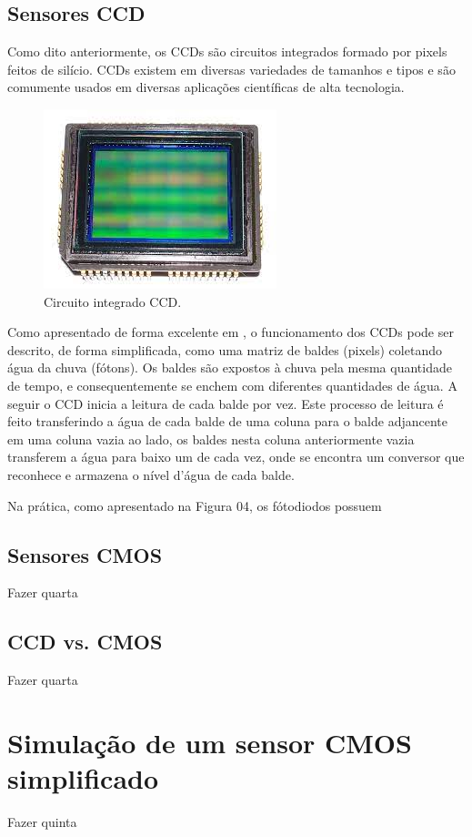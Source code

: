 \documentclass[11pt,a4paper,twocolumn]{article}
\begin{document}
	\subsection*{Sensores CCD}
	Como dito anteriormente, os CCDs são circuitos integrados formado por pixels feitos de silício. CCDs existem em diversas variedades de tamanhos e tipos e são comumente usados em diversas aplicações científicas de alta tecnologia.
	
	\begin{figure}[!h]
		\centering
		\includegraphics[scale=0.4]{imagens/ccd.jpg}
		\caption{Circuito integrado CCD.}
	\end{figure}
		
	Como apresentado de forma excelente em \cite{Spectral}, o funcionamento dos CCDs pode ser descrito, de forma simplificada, como uma matriz de baldes (pixels) coletando água da chuva (fótons). Os baldes são expostos à chuva pela mesma quantidade de tempo, e consequentemente se enchem com diferentes quantidades de água. A seguir o CCD inicia a leitura de cada balde por vez. Este processo de leitura é feito transferindo a água de cada balde de uma coluna para o balde adjancente em uma coluna vazia ao lado, os baldes nesta coluna anteriormente vazia transferem a água para baixo um de cada vez, onde se encontra um conversor que reconhece e armazena o nível d'água de cada balde.
	
	Na prática, como apresentado na Figura 04, os fótodiodos possuem 
	
	\subsection*{Sensores CMOS}
	Fazer quarta
	\subsection*{CCD vs. CMOS}
	Fazer quarta

	\section*{Simulação de um sensor CMOS simplificado}
	Fazer quinta	
\end{document}
